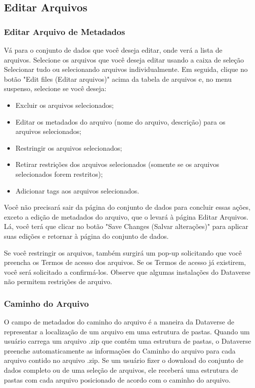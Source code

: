 \documentclass[12pt,hidelinks]{article}
\begin{document}
    \subsection{Editar Arquivos}

        \subsubsection{Editar Arquivo de Metadados}
        
\qquad Vá para o conjunto de dados que você deseja editar, onde verá a lista de arquivos. Selecione os arquivos que você deseja editar usando a caixa de seleção Selecionar tudo ou selecionando arquivos individualmente. Em seguida, clique no botão "Edit files (Editar arquivos)" acima da tabela de arquivos e, no menu suspenso, selecione se você deseja:

\begin{itemize}

    \item Excluir os arquivos selecionados;
    \item Editar os metadados do arquivo (nome do arquivo, descrição) para os arquivos selecionados;
    \item Restringir os arquivos selecionados;
    \item Retirar restrições dos arquivos selecionados (somente se os arquivos selecionados forem restritos);
    \item Adicionar tags aos arquivos selecionados.

\end{itemize}

Você não precisará sair da página do conjunto de dados para concluir essas ações, exceto a edição de metadados do arquivo, que o levará à página Editar Arquivos. Lá, você terá que clicar no botão "Save Changes (Salvar alterações)" para aplicar suas edições e retornar à página do conjunto de dados.

Se você restringir os arquivos, também surgirá um pop-up solicitando que você preencha os Termos de acesso dos arquivos. Se os Termos de acesso já existirem, você será solicitado a confirmá-los. Observe que algumas instalações do Dataverse não permitem restrições de arquivo.
        
        \subsubsection{Caminho do Arquivo}
        
\qquad O campo de metadados do caminho do arquivo é a maneira da Dataverse de representar a localização de um arquivo em uma estrutura de pastas. Quando um usuário carrega um arquivo .zip que contém uma estrutura de pastas, o Dataverse preenche automaticamente as informações do Caminho do arquivo para cada arquivo contido no arquivo .zip. Se um usuário fizer o download do conjunto de dados completo ou de uma seleção de arquivos, ele receberá uma estrutura de pastas com cada arquivo posicionado de acordo com o caminho do arquivo.
\end{document}
